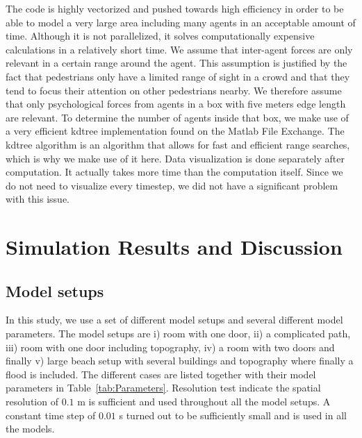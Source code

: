 \documentclass[11pt]{article}
\begin{document}
The code is highly vectorized and pushed towards high efficiency in order to be able to model a very large area including many agents in an acceptable amount of time. Although it is not parallelized, it solves computationally expensive calculations in a relatively short time. We assume that inter-agent forces are only relevant in a certain range around the agent. This assumption is justified by the fact that pedestrians only have a limited range of sight in a crowd and that they tend to focus their attention on other pedestrians nearby. We therefore assume that only psychological forces from agents in a box with five meters edge length are relevant. To determine the number of agents inside that box, we make use of a very efficient kdtree implementation found on the Matlab File Exchange. The kdtree algorithm is an algorithm that allows for fast and efficient range searches, which is why we make use of it here.
Data visualization is done separately after computation. It actually takes more time than the computation itself. Since we do not need to visualize every timestep, we did not have a significant problem with this issue.

\section{Simulation Results and Discussion}

\subsection{Model setups}

In this study, we use a set of different model setups and several different model parameters. The model setups are i) room with one door, ii) a complicated path, iii) room with one door including topography, iv) a room with two doors and finally v) large beach setup with several buildings and topography where finally a flood is included. The different cases are listed together with their model parameters in Table~\ref{tab:Parameters}. Resolution test indicate the spatial resolution of $0.1$ m is sufficient and used throughout all the model setups. A constant time step of $0.01$ s turned out to be sufficiently small and is used in all the models.

\end{document}
